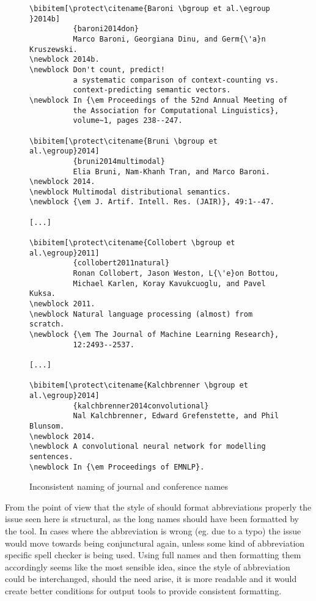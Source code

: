 \begin{figure}[ht]
  \centering
\begin{small}
\begin{verbatim}
\bibitem[\protect\citename{Baroni \bgroup et al.\egroup }2014b]
          {baroni2014don}
          Marco Baroni, Georgiana Dinu, and Germ{\'a}n Kruszewski.
\newblock 2014b.
\newblock Don't count, predict!
          a systematic comparison of context-counting vs.
          context-predicting semantic vectors.
\newblock In {\em Proceedings of the 52nd Annual Meeting of
          the Association for Computational Linguistics},
          volume~1, pages 238--247.

\bibitem[\protect\citename{Bruni \bgroup et al.\egroup}2014]
          {bruni2014multimodal}
          Elia Bruni, Nam-Khanh Tran, and Marco Baroni.
\newblock 2014.
\newblock Multimodal distributional semantics.
\newblock {\em J. Artif. Intell. Res. (JAIR)}, 49:1--47.

[...]

\bibitem[\protect\citename{Collobert \bgroup et al.\egroup}2011]
          {collobert2011natural}
          Ronan Collobert, Jason Weston, L{\'e}on Bottou,
          Michael Karlen, Koray Kavukcuoglu, and Pavel Kuksa.
\newblock 2011.
\newblock Natural language processing (almost) from scratch.
\newblock {\em The Journal of Machine Learning Research},
          12:2493--2537.

[...]

\bibitem[\protect\citename{Kalchbrenner \bgroup et al.\egroup}2014]
          {kalchbrenner2014convolutional}
          Nal Kalchbrenner, Edward Grefenstette, and Phil Blunsom.
\newblock 2014.
\newblock A convolutional neural network for modelling sentences.
\newblock In {\em Proceedings of EMNLP}.
\end{verbatim}
\end{small}
  \caption{Inconsistent naming of journal and conference names}
\label{fig:inconsistent_naming}
\end{figure}

From the point of view that the style of {\bibtex} should format
abbreviations properly the issue seen here is structural, as the long
names should have been formatted by the tool.  In cases where the
abbreviation is wrong (eg. due to a typo) the issue would move towards
being conjunctural again, unless some kind of abbreviation specific
spell checker is being used.  Using full names and then formatting
them accordingly seems like the most sensible idea, since the style of
abbreviation could be interchanged, should the need arise, it is more
readable and it would create better conditions for output tools to
provide consistent formatting.

